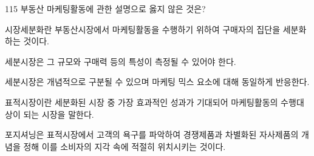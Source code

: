 \begin{question}{115}
부동산 마케팅활동에 관한 설명으로 옳지 않은 것은?
\begin{choices}
  \item 시장세분화란 부동산시장에서 마케팅활동을 수행하기 위하여 구매자의 집단을 세분화하는 것이다.
  \item 세분시장은 그 규모와 구매력 등의 특성이 측정될 수 있어야 한다.
  \item 세분시장은 개념적으로 구분될 수 있으며 마케팅 믹스 요소에 대해 동일하게 반응한다.
  \item 표적시장이란 세분화된 시장 중 가장 효과적인 성과가 기대되어 마케팅활동의 수행대상이 되는 시장을 말한다.
  \item 포지셔닝은 표적시장에서 고객의 욕구를 파악하여 경쟁제품과 차별화된 자사제품의 개념을 정해 이를 소비자의 지각 속에 적절히 위치시키는 것이다.
\end{choices}
\end{question}
